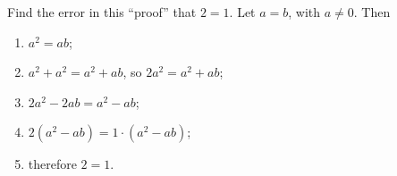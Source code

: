 Find the error in this ``proof'' that $2=1$. Let $a=b$, with $a\ne0$. Then
\begin{enumerate}
\item $a^2=ab$;
\item $a^2+a^2=a^2+ab$, so $2a^2=a^2+ab$;
\item $2a^2-2ab=a^2-ab$;
\item $2\left(a^2-ab\right)=1\cdot\left(a^2-ab\right)$;
\item therefore $2=1$.
\end{enumerate}
